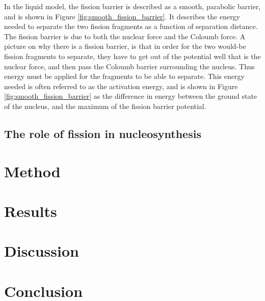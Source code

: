 \documentclass[]{article}
\begin{document}
 In the liquid model, the fission barrier is described as a smooth, parabolic barrier, and is shown in Figure \ref{fig:smooth_fission_barrier}. It describes the energy needed to separate the two fission fragments as a function of separation distance. The fission barrier is due to both the nuclear force and the Coloumb force. A picture on why there is a fission barrier, is that in order for the two would-be fission fragments to separate, they have to get out of the potential well that is the nuclear force, and then pass the Coloumb barrier surrounding the nucleus. Thus energy must be applied for the fragments to be able to separate. This energy needed is often referred to as the activation energy, and is shown in Figure \ref{fig:smooth_fission_barrier} as the difference in energy between the ground state of the nucleus, and the maximum of the fission barrier potential. 

\subsection{The role of fission in nucleosynthesis}


\section{Method}


\section{Results}

\section{Discussion}

\section{Conclusion}



 
\end{document}
